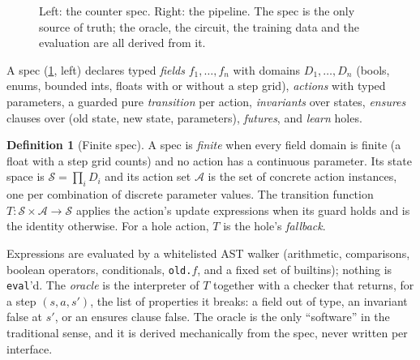 \documentclass{article}
\theoremstyle{plain}
\theoremstyle{definition}
\newtheorem{definition}{Definition}
\theoremstyle{remark}
\newcommand{\Sset}{\mathcal{S}}
\newcommand{\Aset}{\mathcal{A}}
\begin{document}
\begin{figure}[t]
\begin{minipage}[t]{0.49\textwidth}
\end{minipage}
\caption{Left: the counter spec. Right: the pipeline. The spec is the only source of truth; the oracle, the circuit, the training data and the evaluation are all derived from it.}
\label{fig:pipeline}
\end{figure}

A spec (\cref{fig:pipeline}, left) declares typed \emph{fields} $f_1,\dots,f_n$ with domains $D_1,\dots,D_n$ (bools, enums, bounded ints, floats with or without a step grid), \emph{actions} with typed parameters, a guarded pure \emph{transition} per action, \emph{invariants} over states, \emph{ensures} clauses over (old state, new state, parameters), \emph{futures}, and \emph{learn} holes.

\begin{definition}[Finite spec]
A spec is \emph{finite} when every field domain is finite (a float with a step grid counts) and no action has a continuous parameter. Its state space is $\Sset=\prod_i D_i$ and its action set $\Aset$ is the set of concrete action instances, one per combination of discrete parameter values. The transition function $T:\Sset\times\Aset\to\Sset$ applies the action's update expressions when its guard holds and is the identity otherwise. For a hole action, $T$ is the hole's \emph{fallback}.
\end{definition}

Expressions are evaluated by a whitelisted AST walker (arithmetic, comparisons, boolean operators, conditionals, \texttt{old.}$f$, and a fixed set of builtins); nothing is \texttt{eval}'d. The \emph{oracle} is the interpreter of $T$ together with a checker that returns, for a step $(s,a,s')$, the list of properties it breaks: a field out of type, an invariant false at $s'$, or an ensures clause false. The oracle is the only ``software'' in the traditional sense, and it is derived mechanically from the spec, never written per interface.
\end{document}
